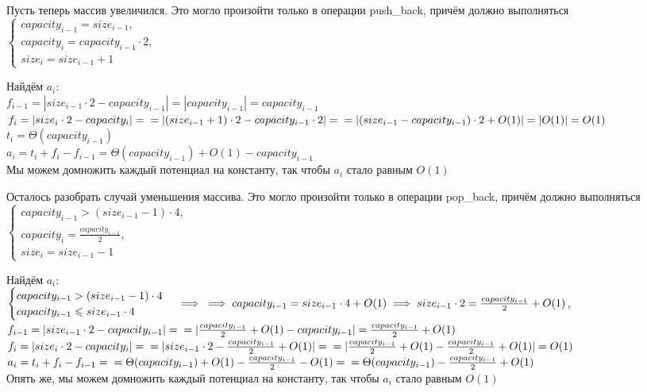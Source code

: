 \documentclass{article}
\newcommand{\ci}[1][i]{capacity_{#1}}
\newcommand{\cpi}{\ci[i-1]}
\newcommand{\si}[1][i]{size_{#1}}
\newcommand{\spi}{\si[i-1]}
\begin{document}
	Пусть теперь массив увеличился. Это могло произойти только в операции push\_back, причём должно выполняться\\
	$\begin{cases}
		\cpi=\spi,\\
		\ci=\cpi\cdot2,\\
		\si=\spi+1
	\end{cases}$
	
	Найдём $a_i$:\\
	$f_{i-1}=|\spi\cdot2-\cpi|=|\cpi|=\cpi$\\
	$f_i=|\si\cdot2-\ci|=\\
	=|(\spi+1)\cdot2-\cpi\cdot2|=\\
	=|(\spi-\cpi)\cdot2+O(1)|=|O(1)|=O(1)$\\
	$t_i=\Theta(\cpi)$\\
	$a_i=t_i+f_i-f_{i-1}=\Theta(\cpi)+O(1)-\cpi$\\
	Мы можем домножить каждый потенциал на константу, так чтобы $a_i$ стало равным $O(1)$
	
	Осталось разобрать случай уменьшения массива. Это могло произойти только в операции pop\_back, причём должно выполняться\\
	$\begin{cases}
	\cpi>(\spi-1)\cdot4,\\
	\ci=\frac{\cpi}{2},\\
	\si=\spi-1
	\end{cases}$
	
	Найдём $a_i$:\\
	$\begin{cases}
		\cpi >         (\spi-1)\cdot4 \\
		\cpi \leqslant \spi\cdot4
	\end{cases} \implies\\ 
	\implies \cpi=\spi\cdot4+O(1)\\
	\implies \spi\cdot2=\frac{\cpi}{2}+O(1)$,\\
	$f_{i-1}=|\spi\cdot2-\cpi|=\\
	=|\frac{\cpi}{2}+O(1)-\cpi|=\frac{\cpi}{2}+O(1)$\\
	$f_i=|\si\cdot2-\ci|=\\
	=|\spi\cdot2-\frac{\cpi}{2}+O(1)|=\\
	=|\frac{\cpi}{2}+O(1)-\frac{\cpi}{2}+O(1)|=O(1)$\\
	$a_i=t_i+f_i-f_{i-1}=\\
	=\Theta(\cpi)+O(1)-\frac{\cpi}{2}-O(1)=\\
	=\Theta(\cpi)-\frac{\cpi}{2}+O(1)$\\
	Опять же, мы можем домножить каждый потенциал на константу, так чтобы $a_i$ стало равным $O(1)$
	
\end{document}
